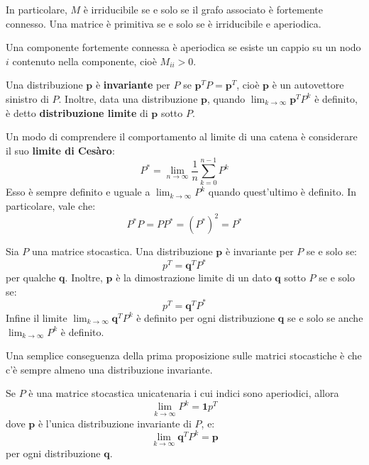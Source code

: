 \documentclass[\main/main.tex]{subfiles}
\begin{document}
\begin{multicols}{2}
\begin{definition}
    In particolare, \(M\) è irriducibile se e solo se il grafo associato è fortemente connesso. Una matrice è primitiva se e solo se è irriducibile e aperiodica.
\end{definition}
\begin{observation}
    Una componente fortemente connessa è aperiodica se esiste un cappio su un nodo \(i\) contenuto nella componente, cioè \(M_{ii} > 0\). 
\end{observation}
\begin{definition}
    Una distribuzione \(\bm{p}\) è \textbf{invariante} per \(P\) se \(\bm{p}^{T} P=\bm{p}^{T}\), cioè \(\bm{p}\) è un autovettore sinistro di \(P\). Inoltre, data una distribuzione \(\bm{p}\), quando \(
        \lim _{k \rightarrow \infty} \boldsymbol{p}^{T} P^{k}
    \) è definito, è detto \textbf{distribuzione limite} di \(\bm{p}\) sotto \(P\).
\end{definition}
\begin{definition}
    Un modo di comprendere il comportamento al limite di una catena è considerare il suo \textbf{limite di Cesàro}:
    \[
        P^{*}=\lim _{n \rightarrow \infty} \frac{1}{n} \sum_{k=0}^{n-1} P^{k}
    \]
    Esso è sempre definito e uguale a \(\lim _{k \rightarrow \infty} P^{k}\) quando quest'ultimo è definito. In particolare, vale che:
    \[
        P^{*} P=P P^{*}=\left(P^{*}\right)^{2}=P^{*}
    \]
\end{definition}
\begin{proposition}
    Sia \(P\) una matrice stocastica. Una distribuzione \(\bm{p}\) è invariante per \(P\) se e solo se:
    \[
        p^{T}=\boldsymbol{q}^{T} P^{*}
    \]
    per qualche \(\bm{q}\). Inoltre, \(\bm{p}\) è la dimostrazione limite di un dato \(\bm{q}\) sotto \(P\) se e solo se:
    \[
        p^{T}=\boldsymbol{q}^{T} P^{*}
    \]
    Infine il limite \(
        \lim _{k \rightarrow \infty} \boldsymbol{q}^{T} P^{k}
    \) è definito per ogni distribuzione \(\bm{q}\) se e solo se anche \(
        \lim _{k \rightarrow \infty} P^{k}
    \) è definito.
\end{proposition}
\begin{observation}
    Una semplice conseguenza della prima proposizione sulle matrici stocastiche è che c'è sempre almeno una distribuzione invariante.
\end{observation}
\begin{proposition}
    Se \(P\) è una matrice stocastica unicatenaria i cui indici sono aperiodici, allora
    \[
        \lim _{k \rightarrow \infty} P^{k}=\mathbf{1} p^{T}
    \]
    dove \(\bm{p}\) è l'unica distribuzione invariante di \(P\), e:
    \[
        \lim _{k \rightarrow \infty} \boldsymbol{q}^{T} P^{k}=\boldsymbol{p}
    \]
    per ogni distribuzione \(\bm{q}\).
\end{proposition}
\end{multicols}
\end{document}
